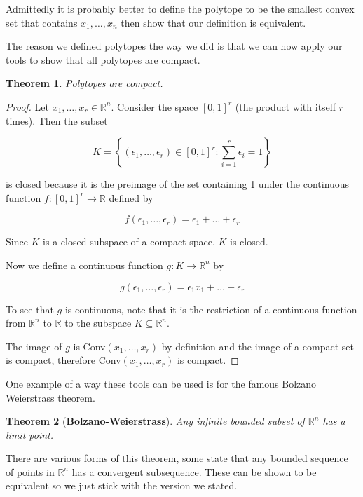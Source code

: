 \documentclass[a4paper]{article}
\newtheorem{theorem}{Theorem}
\numberwithin{theorem}{section}
\begin{document}
Admittedly it is probably better to define the polytope to be the smallest convex set that contains $x_1,\dots,x_n$ then show that our definition is equivalent.

The reason we defined polytopes the way we did is that we can now apply our tools to show that all polytopes are compact.

\begin{theorem}
Polytopes are compact.
\end{theorem}

\begin{proof}
Let $x_1,\dots,x_r \in \mathbb{R}^n$. Consider the space $[0,1]^r$ (the product with itself $r$ times). Then the subset

$$ K = \left\{(\epsilon_1,\dots,\epsilon_r) \in [0,1]^r : \sum_{i=1}^r \epsilon_i = 1\right\} $$

is closed because it is the preimage of the set containing 1 under the continuous function $f: [0,1]^r \rightarrow \mathbb{R}$ defined by

$$ f(\epsilon_1,\dots,\epsilon_r) = \epsilon_1+\dots+\epsilon_r $$

Since $K$ is a closed subspace of a compact space, $K$ is closed.

Now we define a continuous function $g: K \rightarrow \mathbb{R}^n$ by

$$ g(\epsilon_1,\dots,\epsilon_r) = \epsilon_1 x_1 + \dots + \epsilon_r $$

To see that $g$ is continuous, note that it is the restriction of a continuous function from $\mathbb{R}^n$ to $\mathbb{R}$ to the subspace $K \subseteq \mathbb{R}^n$.

The image of $g$ is Conv$(x_1,\dots,x_r)$ by definition and the image of a compact set is compact, therefore Conv$(x_1,\dots,x_r)$ is compact.

\end{proof}


One example of a way these tools can be used is for the famous Bolzano Weierstrass theorem.

\begin{theorem}[\textbf{Bolzano-Weierstrass}]
Any infinite bounded subset of $\mathbb{R}^n$ has a limit point.
\end{theorem}

There are various forms of this theorem, some state that any bounded sequence of points in $\mathbb{R}^n$ has a convergent subsequence. These can be shown to be equivalent so we just stick with the version we stated.
\end{document}

